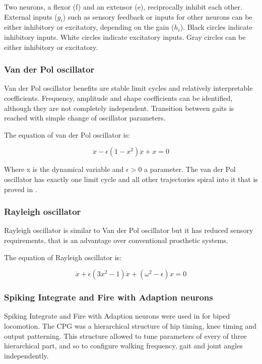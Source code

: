 \documentclass[12pt,a4paper]{report}
\begin{document}
				Two neurons, a flexor (f) and an extensor (e), reciprocally inhibit each other. External inputs ($g_i$) such as sensory feedback or inputs for other neurons can be either inhibitory or excitatory, depending on the gain ($h_i$). Black circles indicate inhibitory inputs. White circles indicate excitatory inputs. Gray circles can be either inhibitory or excitatory.
			\subsubsection{Van der Pol oscillator}
				Van der Pol oscillator benefits are stable limit cycles and relatively interpretable coefficients. Frequency, amplitude and shape coefficients can be identified, although they are not completely independent. Transition between gaits is reached with simple change of oscillator parameters.
				
				The equation of van der Pol oscillator is:
				
				\begin{equation}\label{eq:Pol1}
					\ddot{x} - \epsilon(1 - x^2)\dot{x} + x = 0
				\end{equation}
				
				Where x is the dynamical variable and $\epsilon > 0$ a parameter.
				The van der Pol oscillator has exactly one limit cycle and all other trajectories spiral into it that is proved in \cite{kanamaru2007van}.
			\subsubsection{Rayleigh oscillator}
				Rayleigh oscillator is similar to Van der Pol oscillator but it has reduced sensory requirements, that is an advantage over conventional prosthetic systems.
				
				The equation of Rayleigh oscillator is:
				
				\begin{equation}\label{eq:Rel1}
					\ddot{x} + \epsilon(3x^2 - 1)\dot{x} + (\omega^2 - \epsilon)x = 0
				\end{equation}
			\subsubsection{Spiking Integrate and Fire with Adaption neurons}
				Spiking Integrate and Fire with Adaption neurons were used in \cite{russell2007configuring} for biped locomotion. The CPG was a hierarchical structure of hip timing, knee timing and output patterning. This structure allowed to tune parameters of every of three hierarchical part, and so to configure walking frequency, gait and joint angles independently.
\end{document}
